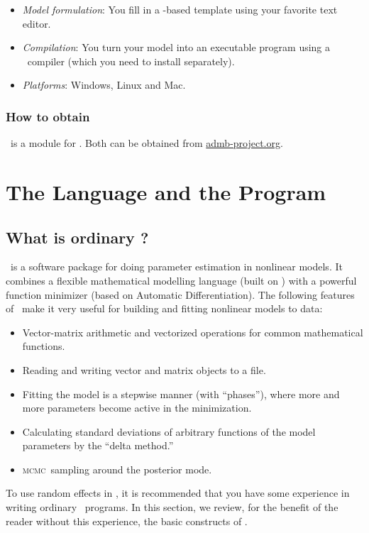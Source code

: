 \documentclass{admbmanual}
\newcommand{\scMCMC}{\textsc{mcmc}}
\begin{document}
\begin{itemize}
  \item\textit{Model formulation}: You fill in a \cplus-based template using
  your favorite text editor.

  \item \textit{Compilation}: You turn your model into an executable program
  using a \cplus\ compiler (which you need to install separately).

  \item\textit{Platforms}: Windows, Linux and Mac.
\end{itemize}

\subsection{How to obtain \scAR}

\scAR\ is a module for \scAB. Both can be obtained from
\href{admb-project.org}{admb-project.org}.

\chapter{The Language and the Program}

\section{What is ordinary \scAB?}

\scAB\ is a software package for doing parameter estimation in nonlinear models.
It combines a flexible mathematical modelling language (built on \cplus) with a
powerful function minimizer (based on Automatic Differentiation). The following
features of \scAB\ make it very useful for building and fitting nonlinear models
to data:

\begin{itemize}
  \item Vector-matrix arithmetic and vectorized operations for common
  mathematical functions.
  \item Reading and writing vector and matrix objects to a file.
  \item Fitting the model is a stepwise manner (with ``phases''), where more and
  more parameters become active in the minimization.
  \item Calculating standard deviations of arbitrary functions of the model
  parameters by the ``delta method.''
  \item \scMCMC\ sampling around the posterior mode.
\end{itemize}
To use random effects in \scAB, it is recommended that you have some experience
in writing ordinary \scAB\ programs. In this section, we review, for the benefit
of the reader without this experience, the basic constructs of \scAB.
\end{document}
